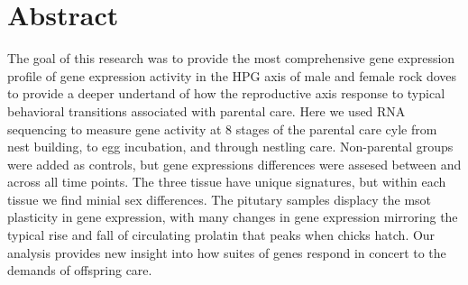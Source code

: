 \documentclass[10pt,letterpaper]{article}
\newcommand{\getIndex}[2]{
  \ForEach{,}{\IfEq{#1}{\thislevelitem}{\number\thislevelcount\ExitForEach}{}}{#2}
}
\newcommand{\getAff}[1]{
  \getIndex{#1}{UC Davis,UNH}
}
\begin{document}
\vspace*{0.2in}

\section*{Abstract}
The goal of this research was to provide the most comprehensive gene
expression profile of gene expression activity in the HPG axis of male
and female rock doves to provide a deeper undertand of how the
reproductive axis response to typical behavioral transitions associated
with parental care. Here we used RNA sequencing to measure gene activity
at 8 stages of the parental care cyle from nest building, to egg
incubation, and through nestling care. Non-parental groups were added as
controls, but gene expressions differences were assesed between and
across all time points. The three tissue have unique signatures, but
within each tissue we find minial sex differences. The pitutary samples
displacy the msot plasticity in gene expression, with many changes in
gene expression mirroring the typical rise and fall of circulating
prolatin that peaks when chicks hatch. Our analysis provides new insight
into how suites of genes respond in concert to the demands of offspring
care.
\end{document}
